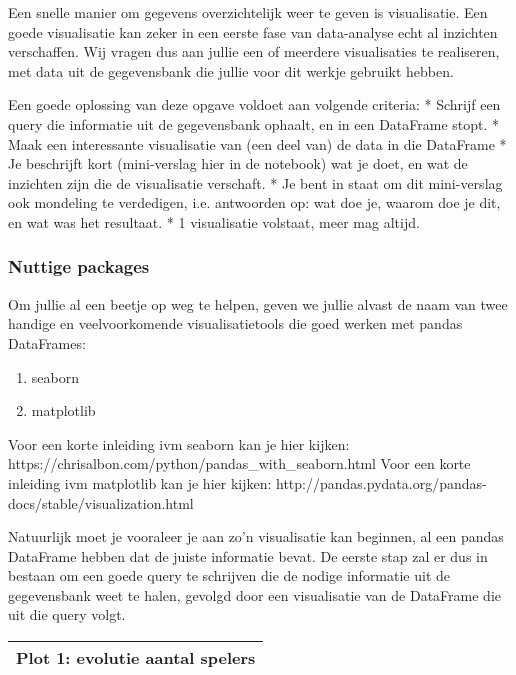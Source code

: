 \documentclass[11pt]{article}
\providecommand{\tightlist}{%
      \setlength{\itemsep}{0pt}\setlength{\parskip}{0pt}}
\begin{document}
Een snelle manier om gegevens overzichtelijk weer te geven is
visualisatie. Een goede visualisatie kan zeker in een eerste fase van
data-analyse echt al inzichten verschaffen. Wij vragen dus aan jullie
een of meerdere visualisaties te realiseren, met data uit de
gegevensbank die jullie voor dit werkje gebruikt hebben.

Een goede oplossing van deze opgave voldoet aan volgende criteria: *
Schrijf een query die informatie uit de gegevensbank ophaalt, en in een
DataFrame stopt. * Maak een interessante visualisatie van (een deel van)
de data in die DataFrame * Je beschrijft kort (mini-verslag hier in de
notebook) wat je doet, en wat de inzichten zijn die de visualisatie
verschaft. * Je bent in staat om dit mini-verslag ook mondeling te
verdedigen, i.e. antwoorden op: wat doe je, waarom doe je dit, en wat
was het resultaat. * 1 visualisatie volstaat, meer mag altijd.

\subsubsection{Nuttige packages}\label{nuttige-packages}

Om jullie al een beetje op weg te helpen, geven we jullie alvast de naam
van twee handige en veelvoorkomende visualisatietools die goed werken
met pandas DataFrames:

\begin{enumerate}
\def\labelenumi{\arabic{enumi}.}
\tightlist
\item
  seaborn
\item
  matplotlib
\end{enumerate}

Voor een korte inleiding ivm seaborn kan je hier kijken:
https://chrisalbon.com/python/pandas\_with\_seaborn.html Voor een korte
inleiding ivm matplotlib kan je hier kijken:
http://pandas.pydata.org/pandas-docs/stable/visualization.html

Natuurlijk moet je vooraleer je aan zo'n visualisatie kan beginnen, al
een pandas DataFrame hebben dat de juiste informatie bevat. De eerste
stap zal er dus in bestaan om een goede query te schrijven die de nodige
informatie uit de gegevensbank weet te halen, gevolgd door een
visualisatie van de DataFrame die uit die query volgt.

    \begin{longtable}[]{@{}l@{}}
\toprule
Plot 1: evolutie aantal spelers\tabularnewline
\bottomrule
\end{longtable}
\end{document}
